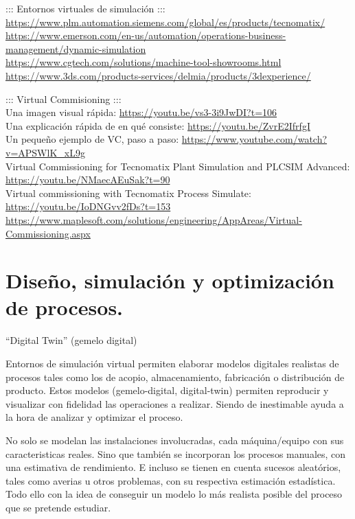 \documentclass[spanish,12pt,a4paper,final,oneside]{book}
\begin{document}
::: Entornos virtuales de simulación :::
\\ \url{https://www.plm.automation.siemens.com/global/es/products/tecnomatix/}
\\ \url{https://www.emerson.com/en-us/automation/operations-business-management/dynamic-simulation}
\\ \url{https://www.cgtech.com/solutions/machine-tool-showrooms.html}
\\ \url{https://www.3ds.com/products-services/delmia/products/3dexperience/}

::: Virtual Commisioning :::
\\ Una imagen visual rápida: \url{https://youtu.be/vs3-3i9JwDI?t=106}
\\ Una explicación rápida de en qué consiste: \url{https://youtu.be/ZvrE2IfrfgI}
\\ Un pequeño ejemplo de VC, paso a paso: \url{https://www.youtube.com/watch?v=APSWlK_xL9g}
\\ Virtual Commissioning for Tecnomatix Plant Simulation and PLCSIM Advanced:
\\ \url{https://youtu.be/NMaecAEuSak?t=90}
\\ Virtual commissioning with Tecnomatix Process Simulate:
\\ \url{https://youtu.be/IoDNGvv2fDs?t=153}
\\ \url{https://www.maplesoft.com/solutions/engineering/AppAreas/Virtual-Commissioning.aspx}

\section{Diseño, simulación y optimización de procesos.}\label{simulacion_de_procesos}
``Digital Twin'' (gemelo digital) 

Entornos de simulación virtual permiten elaborar modelos digitales realistas de procesos tales como los de acopio, almacenamiento, fabricación o distribución de producto. Estos modelos (gemelo-digital, digital-twin) permiten reproducir y visualizar con fidelidad las operaciones a realizar. Siendo de inestimable ayuda a la hora de analizar y optimizar el proceso. 

No solo se modelan las instalaciones involucradas, cada máquina/equipo con sus caracteristicas reales. Sino que también se incorporan los procesos manuales, con una estimativa de rendimiento. E incluso se tienen en cuenta sucesos aleatórios, tales como averias u otros problemas, con su respectiva estimación estadística. Todo ello con la idea de conseguir un modelo lo más realista posible del proceso que se pretende estudiar.
\end{document}

